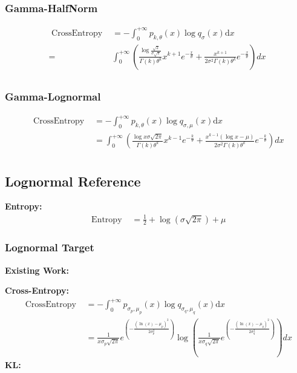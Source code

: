 \documentclass{article}
\begin{document}
\subsubsection{Gamma-HalfNorm}

$$ \begin{aligned} \text { CrossEntropy }&=-\int_{0}^{+\infty} p_{k, \theta}(x) \log q_{\sigma}(x) \mathrm{d} x \\
=&\int_{0}^{+\infty } (\frac{\log\frac{\sqrt{2}}{\sigma{\sqrt{\pi}}} }{\Gamma (k)\theta^{k}} x^{k+1}e^{-\frac{x}{\theta}}+\frac{x^{k+1}}{2\sigma^{2}\Gamma (k)\theta^{k}}e^{-\frac{x}{\theta} })dx\\
\end{aligned} $$
\subsubsection{Gamma-Lognormal}
$$ \begin{aligned} \text { CrossEntropy }&=-\int_{0}^{+\infty} p_{k, \theta}(x) \log q_{\sigma,\mu}(x) \mathrm{d} x \\
&=\int_{0}^{+\infty } (\frac{\log x\sigma\sqrt{2\pi} }{\Gamma(k)\theta^{k}} x^{k-1}e^{-\frac{k}{\theta} }+\frac{x^{k-1}(\log x-\mu)}{2\sigma^{2}\Gamma(k)\theta^{k}}e^{-\frac{k}{\theta} })dx\\
\end{aligned} $$

\subsection{Lognormal Reference}

\noindent \textbf{Entropy:}
$$ \begin{aligned} \text { Entropy }&=\frac{1}{2}+\log (\sigma \sqrt{2 \pi})+\mu
\end{aligned} $$

\subsubsection{Lognormal Target}

\noindent \textbf{Existing Work:}

\noindent \textbf{Cross-Entropy:}
$$ \begin{aligned} \text { CrossEntropy }&=-\int_{0}^{+\infty} p_{\sigma_{p},\mu_{p}}(x) \log q_{\sigma_{q},\mu_{q}}(x) \mathrm{d} x\\
&=\frac{1}{x \sigma_{p} \sqrt{2 \pi}} e^{\left(-\frac{(\ln (x)-\mu_{p})^{2}}{2 \sigma_{p}^{2}}\right)}\log(\frac{1}{x \sigma_{q} \sqrt{2 \pi}} e^{\left(-\frac{(\ln (x)-\mu_{q})^{2}}{2 \sigma_{q}^{2}}\right)})dx
\end{aligned} $$
\noindent \textbf{KL:}
\end{document}
